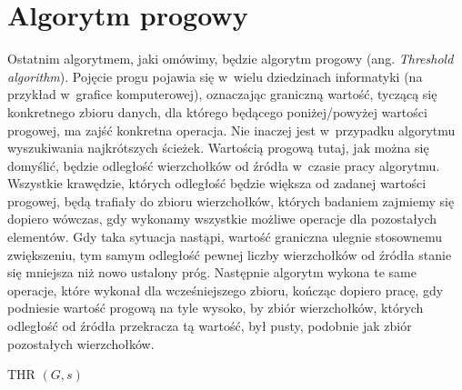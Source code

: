\section{Algorytm progowy}

Ostatnim algorytmem, jaki omówimy, będzie algorytm progowy (ang. \textit{Threshold algorithm}). Pojęcie progu pojawia się w~wielu dziedzinach informatyki (na przykład w~grafice komputerowej), oznaczając graniczną wartość, tyczącą się konkretnego zbioru danych, dla którego będącego poniżej/powyżej wartości progowej, ma zajść konkretna operacja. Nie inaczej jest w~przypadku algorytmu wyszukiwania najkrótszych ścieżek. Wartością progową tutaj, jak można się domyślić, będzie odległość wierzchołków od źródła w~czasie pracy algorytmu. Wszystkie krawędzie, których odległość będzie większa od zadanej wartości progowej, będą trafiały do zbioru wierzchołków, których badaniem zajmiemy się dopiero wówczas, gdy wykonamy wszystkie możliwe operacje dla pozostałych elementów. Gdy taka sytuacja nastąpi, wartość graniczna ulegnie stosownemu zwiększeniu, tym samym odległość pewnej liczby wierzchołków od źródła stanie się mniejsza niż nowo ustalony próg. Następnie algorytm wykona te same operacje, które wykonał dla wcześniejszego zbioru, kończąc dopiero pracę, gdy podniesie wartość progową na tyle wysoko, by zbiór wierzchołków, których odległość od źródła przekracza tą wartość, był pusty, podobnie jak zbiór pozostałych wierzchołków.

\begin{pseudokod}[!htbp]
\DontPrintSemicolon
{}
\caption{ THR $\left( G, s \right)$\label{alg:ThresholdAlgorith}}
\end{pseudokod}


